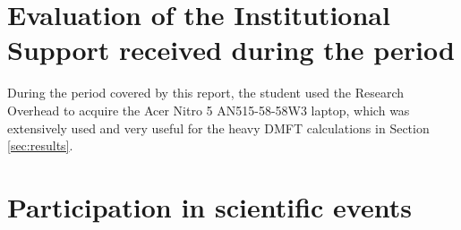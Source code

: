 \documentclass[12pt]{report}
\begin{document}




\chapter{Evaluation of the Institutional Support received during the period} \label{chp:apoioInst}

During the period covered by this report, the student used the Research Overhead to acquire the Acer Nitro 5 AN515-58-58W3 laptop, which was extensively used and very useful for the heavy DMFT calculations in Section \ref{sec:results}.



\chapter{Participation in scientific events} \label{chp:particEvento}
\end{document}
